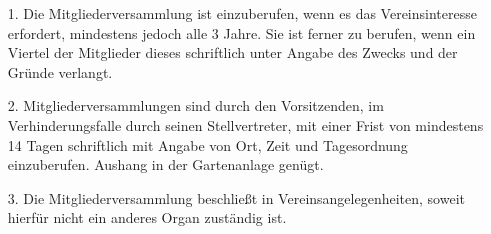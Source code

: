 \documentclass{scrartcl}
\begin{document}
\begin{itemize}
	\item[1.] Die Mitgliederversammlung ist einzuberufen, wenn es das Vereinsinteresse
			  erfordert, mindestens jedoch alle 3 Jahre. Sie ist ferner zu berufen, wenn
			  ein Viertel der Mitglieder dieses schriftlich unter Angabe des Zwecks und
			  der Gründe verlangt.
	\item[2.] Mitgliederversammlungen sind durch den Vorsitzenden, im Verhinderungsfalle
			  durch seinen Stellvertreter, mit einer Frist von mindestens 14 Tagen
			  schriftlich mit Angabe von Ort, Zeit und Tagesordnung einzuberufen.
			  Aushang in der Gartenanlage genügt.
	\item[3.] Die Mitgliederversammlung beschließt in Vereinsangelegenheiten, soweit
			  hierfür nicht ein anderes Organ zuständig ist.
	

\end{itemize}
\end{document}
